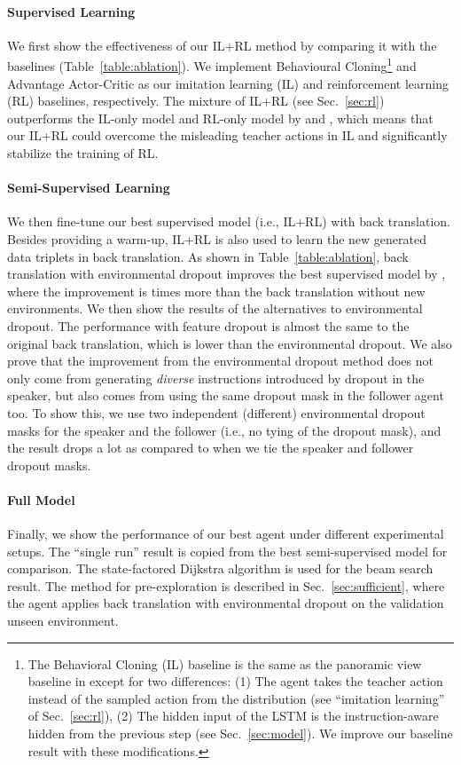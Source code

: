 \documentclass[11pt,a4paper]{article}
\begin{document}
\paragraph{Supervised Learning}
We first show the effectiveness of our IL+RL method by comparing it with the baselines (Table~\ref{table:ablation}).
We implement Behavioural Cloning\footnote{
The Behavioral Cloning (IL) baseline is the same as the panoramic view baseline in  except for two differences:
(1) The agent takes the teacher action instead of the sampled action from the distribution (see ``imitation learning'' of Sec.~\ref{sec:rl}),
(2) The hidden input of the LSTM is the instruction-aware hidden from the previous step (see Sec.~\ref{sec:model}).
We improve our baseline result with these modifications.}
and Advantage Actor-Critic as our imitation learning (IL) and reinforcement learning (RL) baselines, respectively.
The mixture of IL+RL (see Sec.~\ref{sec:rl}) outperforms the IL-only model and RL-only model by  and , 
which means that our IL+RL could overcome the misleading teacher actions in IL and significantly stabilize the training of RL.

\paragraph{Semi-Supervised Learning}
We then fine-tune our best supervised model (i.e., IL+RL) with back translation.
Besides providing a warm-up, IL+RL is also used to learn the new generated data triplets in back translation.
As shown in Table~\ref{table:ablation}, back translation with environmental dropout improves the best supervised model by , where the improvement is  times more than the back translation without new environments.
We then show the results of the alternatives to environmental dropout.
The performance with feature dropout is almost the same to the original back translation, which is  lower than the environmental dropout. 
We also prove that the improvement from the environmental dropout method does not only come from generating \emph{diverse} instructions introduced by dropout in the speaker, but also comes from using the same dropout mask in the follower agent too.
To show this, we use two independent (different) environmental dropout masks for the speaker and the follower (i.e., no tying of the dropout mask), and the result drops a lot as compared to when we tie the speaker and follower dropout masks.

\paragraph{Full Model}
Finally, we show the performance of our best agent under different experimental setups.
The ``single run'' result is copied from the best semi-supervised model for comparison. 
The state-factored Dijkstra algorithm \cite{fried2018speaker} is used for the beam search result.
The method for pre-exploration is described in Sec.~\ref{sec:sufficient}, where the agent applies back translation with environmental dropout on the validation unseen environment.
 
\end{document}
